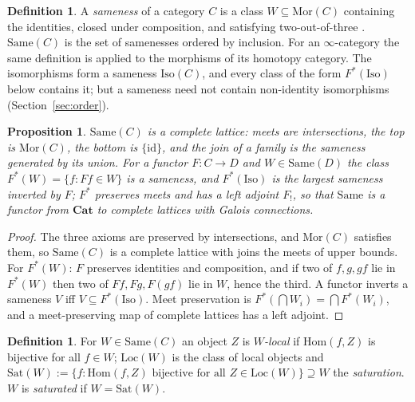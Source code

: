 \documentclass[11pt]{amsart}
\newtheorem{prop}[thm]{Proposition}
\theoremstyle{definition}
\newtheorem{defi}[thm]{Definition}
\newcommand{\Same}{\mathrm{Same}}
\newcommand{\Mor}{\mathrm{Mor}}
\newcommand{\Iso}{\mathrm{Iso}}
\newcommand{\Sat}{\mathrm{Sat}}
\newcommand{\Loc}{\mathrm{Loc}}
\newcommand{\Hom}{\mathrm{Hom}}
\begin{document}
\begin{defi}
A \emph{sameness} of a category $C$ is a class $W\subseteq\Mor(C)$ containing
the identities, closed under composition, and satisfying two-out-of-three
\cite[Def.~2.1]{Same}. $\Same(C)$ is the set of samenesses ordered by inclusion.
For an $\infty$-category the same definition is applied to the morphisms of its
homotopy category. The isomorphisms form a sameness $\Iso(C)$, and every class
of the form $F^*(\Iso)$ below contains it; but a sameness need not contain
non-identity isomorphisms (Section~\ref{sec:order}).
\end{defi}

\begin{prop}\label{prop:lattice}
$\Same(C)$ is a complete lattice: meets are intersections, the top is $\Mor(C)$,
the bottom is $\{\mathrm{id}\}$, and the join of a family is the sameness generated by
its union. For a functor $F\colon C\to D$ and $W\in\Same(D)$ the class
$F^*(W)=\{f:Ff\in W\}$ is a sameness, and $F^*(\Iso)$ is the largest sameness
inverted by $F$; $F^*$ preserves meets and has a left adjoint $F_!$, so that
$\Same$ is a functor from $\mathbf{Cat}$ to complete lattices with Galois
connections.
\end{prop}
\begin{proof}
The three axioms are preserved by intersections, and $\Mor(C)$ satisfies them,
so $\Same(C)$ is a complete lattice with joins the meets of upper bounds. For
$F^*(W)$: $F$ preserves identities and composition, and if two of $f,g,gf$ lie
in $F^*(W)$ then two of $Ff,Fg,F(gf)$ lie in $W$, hence the third. A functor
inverts a sameness $V$ iff $V\subseteq F^*(\Iso)$. Meet preservation is
$F^*(\bigcap W_i)=\bigcap F^*(W_i)$, and a meet-preserving map of complete
lattices has a left adjoint.
\end{proof}

\begin{defi}\label{def:sat}
For $W\in\Same(C)$ an object $Z$ is \emph{$W$-local} if $\Hom(f,Z)$ is bijective
for all $f\in W$; $\Loc(W)$ is the class of local objects and
$\Sat(W):=\{f:\Hom(f,Z)\text{ bijective for all }Z\in\Loc(W)\}\supseteq W$ the
\emph{saturation}. $W$ is \emph{saturated} if $W=\Sat(W)$.
\end{defi}
\end{document}
